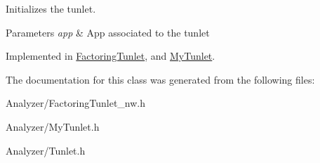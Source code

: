 Initializes the tunlet. 


\begin{DoxyParams}{Parameters}
{\em app} & App associated to the tunlet \\
\hline
\end{DoxyParams}


Implemented in \hyperlink{class_factoring_tunlet_a4883ba0a05903fb09b9f420d72927d86}{Factoring\-Tunlet}, and \hyperlink{class_my_tunlet_a1a43b296664b690282faa724f8e0e6e4}{My\-Tunlet}.



The documentation for this class was generated from the following files\-:\begin{DoxyCompactItemize}
\item 
Analyzer/Factoring\-Tunlet\-\_\-nw.\-h\item 
Analyzer/My\-Tunlet.\-h\item 
Analyzer/Tunlet.\-h\end{DoxyCompactItemize}
